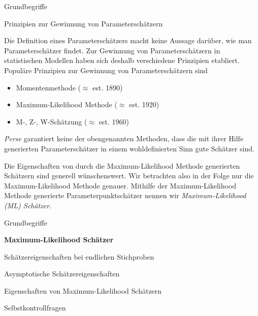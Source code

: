 \documentclass[
  8pt,
  ignorenonframetext,
]{beamer}
\providecommand{\tightlist}{%
  \setlength{\itemsep}{0pt}\setlength{\parskip}{0pt}}
\begin{document}
\begin{frame}{Grundbegriffe}
\protect\hypertarget{grundbegriffe-1}{}
\justifying

Prinzipien zur Gewinnung von Parameterschätzern

\small

Die Definition eines Parameterschätzers macht keine Aussage darüber, wie
man Parameterschätzer findet. Zur Gewinnung von Parameterschätzern in
statistischen Modellen haben sich deshalb verschiedene Prinzipien
etabliert. Populäre Prinzipien zur Gewinnung von Parameterschätzern sind

\begin{itemize}
\tightlist
\item
  Momentenmethode (\(\approx\) est. 1890)
\item
  Maximum-Likelihood Methode (\(\approx\) est. 1920)
\item
  M-, Z-, W-Schätzung (\(\approx\) est. 1960)
\end{itemize}

\emph{Perse} garantiert keine der obengenannten Methoden, dass die mit
ihrer Hilfe generierten Parameterschätzer in einem wohldefinierten Sinn
gute Schätzer sind.

Die Eigenschaften von durch die Maximum-Likelihood Methode generierten
Schätzern sind generell wünschenswert. Wir betrachten also in der Folge
nur die Maximum-Likelihood Methode genauer. Mithilfe der
Maximum-Likelihood Methode generierte Parameterpunktschätzer nennen wir
\emph{Maximum-Likelihood (ML) Schätzer}.
\end{frame}

\begin{frame}{}
\protect\hypertarget{section-7}{}
\large
\vfill
{}

Grundbegriffe

\textbf{Maximum-Likelihood Schätzer}

Schätzereigenschaften bei endlichen Stichproben

Asymptotische Schätzereigenschaften

Eigenschaften von Maximum-Likelihood Schätzern

Selbstkontrollfragen \vfill
\end{frame}
\end{document}
